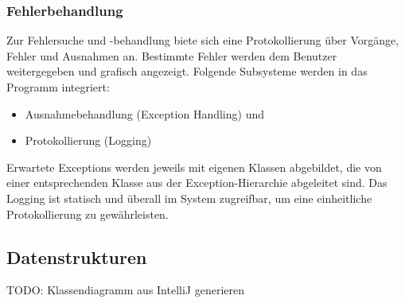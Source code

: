 \subsubsection{Fehlerbehandlung}
Zur Fehlersuche und -behandlung biete sich eine Protokollierung über Vorgänge, Fehler und Ausnahmen an.
Bestimmte Fehler werden dem Benutzer weitergegeben und grafisch angezeigt.
Folgende Subsysteme werden in das Programm integriert:
\begin{itemize}
    \item Ausnahmebehandlung (Exception Handling) und
    \item Protokollierung (Logging)
\end{itemize}
Erwartete Exceptions werden jeweils mit eigenen Klassen abgebildet, die von einer entsprechenden Klasse aus der
Exception-Hierarchie abgeleitet sind.
Das Logging ist statisch und überall im System zugreifbar, um eine einheitliche Protokollierung zu gewährleisten.

\subsection{Datenstrukturen}
TODO: Klassendiagramm aus IntelliJ generieren